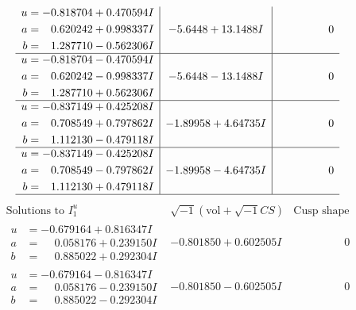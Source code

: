 \documentclass[1p]{elsarticle_modified}
\theoremstyle{definition}
\newcommand{\I}{\sqrt{-1}}
\begin{document}
$$\begin{array}{c|c|c}
\begin{aligned}
u &= -0.818704 + 0.470594 I \\
a &= \phantom{-}0.620242 + 0.998337 I \\
b &= \phantom{-}1.287710 - 0.562306 I\end{aligned}
 & -5.6448 + 13.1488 I & \phantom{-0.000000 } 0 \\ \hline\begin{aligned}
u &= -0.818704 - 0.470594 I \\
a &= \phantom{-}0.620242 - 0.998337 I \\
b &= \phantom{-}1.287710 + 0.562306 I\end{aligned}
 & -5.6448 - 13.1488 I & \phantom{-0.000000 } 0 \\ \hline\begin{aligned}
u &= -0.837149 + 0.425208 I \\
a &= \phantom{-}0.708549 + 0.797862 I \\
b &= \phantom{-}1.112130 - 0.479118 I\end{aligned}
 & -1.89958 + 4.64735 I & \phantom{-0.000000 } 0 \\ \hline\begin{aligned}
u &= -0.837149 - 0.425208 I \\
a &= \phantom{-}0.708549 - 0.797862 I \\
b &= \phantom{-}1.112130 + 0.479118 I\end{aligned}
 & -1.89958 - 4.64735 I & \phantom{-0.000000 } 0\\
 \hline 
 \end{array}$$\newpage$$\begin{array}{c|c|c}  
\text{Solutions to }I^u_{1}& \I (\text{vol} + \sqrt{-1}CS) & \text{Cusp shape}\\
 \hline 
\begin{aligned}
u &= -0.679164 + 0.816347 I \\
a &= \phantom{-}0.058176 + 0.239150 I \\
b &= \phantom{-}0.885022 + 0.292304 I\end{aligned}
 & -0.801850 + 0.602505 I & \phantom{-0.000000 } 0 \\ \hline\begin{aligned}
u &= -0.679164 - 0.816347 I \\
a &= \phantom{-}0.058176 - 0.239150 I \\
b &= \phantom{-}0.885022 - 0.292304 I\end{aligned}
 & -0.801850 - 0.602505 I & \phantom{-0.000000 } 0 \\ \hline\begin{aligned}

\end{aligned}
\end{array}$$
\end{document}
